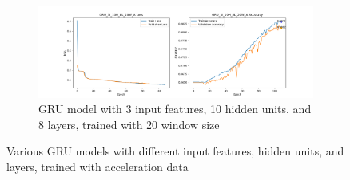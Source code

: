 \documentclass{article}
\begin{document}
\begin{figure}[ht]
\begin{subfigure}
            \label{fig:GRU_3I_10H_4L_20W_A_GRAPH}
        \end{subfigure}
        \begin{subfigure}
            {\textwidth}
            \centering
            \includegraphics[width=\textwidth]{GRU_3I_10H_8L_20W_A_GRAPH.png}
            \caption{GRU model with 3 input features, 10 hidden units, and 8
            layers, trained with 20 window size}
            \label{fig:GRU_3I_10H_8L_20W_A_GRAPH}
        \end{subfigure}
        \caption{Various GRU models with different input features, hidden units,
        and layers, trained with acceleration data}
        \label{fig:GRU_3I_10H_A}
    \end{figure}
\end{document}
